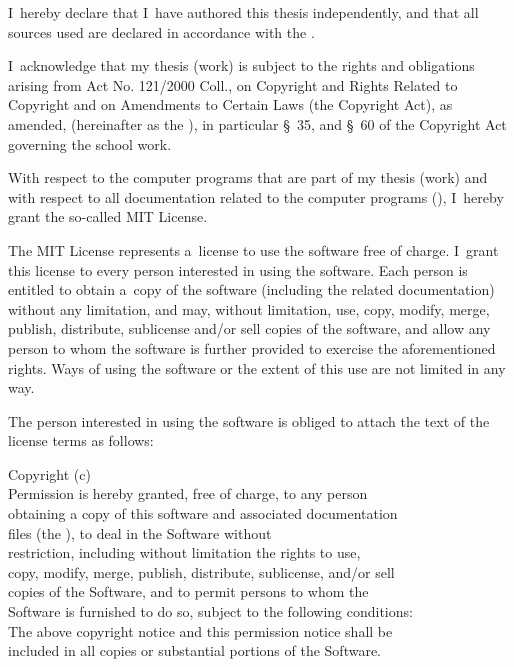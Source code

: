 I~hereby declare that I~have authored this thesis independently,
and that all sources used are declared in accordance with the
.

\vspace{2mm}
I~acknowledge that my thesis (work) is subject to the rights and obligations
arising from Act No. 121/2000 Coll., on Copyright and Rights Related to Copyright
and on Amendments to Certain Laws (the Copyright Act), as amended,
(hereinafter as the ), in particular §~35, and §~60 of the Copyright Act
governing the school work.

\vspace{2mm}
With respect to the computer programs that are part of my thesis (work)
and with respect to all documentation related to the computer programs (),
I~hereby grant the so-called MIT License.

\vspace{2mm}
The MIT License represents a~license to use the software free of charge.
I~grant this license to every person interested in using the software.
Each person is entitled to obtain a~copy of the software (including
the related documentation) without any limitation, and may, without limitation,
use, copy, modify, merge, publish, distribute, sublicense and/or sell
copies of the software, and allow any person to whom the software is further
provided to exercise the aforementioned rights. Ways of using the software or the extent
of this use are not limited in any way.

\vspace{2mm}
The person interested in using the software is obliged to attach the text of the license terms as follows:

\vspace{3mm}
\noindent
Copyright (c) \RokOdevzdani~\AutorPrace \\
Permission is hereby granted, free of charge, to any person \\
obtaining a copy of this software and associated documentation \\
files (the ), to deal in the Software without \\
restriction, including without limitation the rights to use, \\
copy, modify, merge, publish, distribute, sublicense, and/or sell \\
copies of the Software, and to permit persons to whom the \\
Software is furnished to do so, subject to the following conditions: \\
The above copyright notice and this permission notice shall be \\
included in all copies or substantial portions of the Software.

